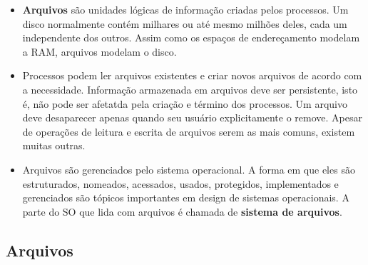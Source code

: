 \documentclass[10pt]{article}
\begin{document}
\begin{itemize}
    \item \textbf{Arquivos} são unidades lógicas de informação criadas pelos processos.
    Um disco normalmente contém milhares ou até mesmo milhões deles, cada um 
    independente dos outros. Assim como os espaços de endereçamento modelam a RAM,
    arquivos modelam o disco.
    \item Processos podem ler arquivos existentes e criar novos arquivos de acordo com 
    a necessidade. Informação armazenada em arquivos deve ser persistente, isto é, não
    pode ser afetatda pela criação e término dos processos. Um arquivo deve desaparecer
    apenas quando seu usuário explicitamente o remove. Apesar de operações de leitura
    e escrita de arquivos serem as mais comuns, existem muitas outras.
    \item Arquivos são gerenciados pelo sistema operacional. A forma em que eles são
    estruturados, nomeados, acessados, usados, protegidos, implementados e gerenciados
    são tópicos importantes em design de sistemas operacionais. A parte do SO que lida
    com arquivos é chamada de \textbf{sistema de arquivos}.
\end{itemize}
\subsection{Arquivos}
\end{document}
